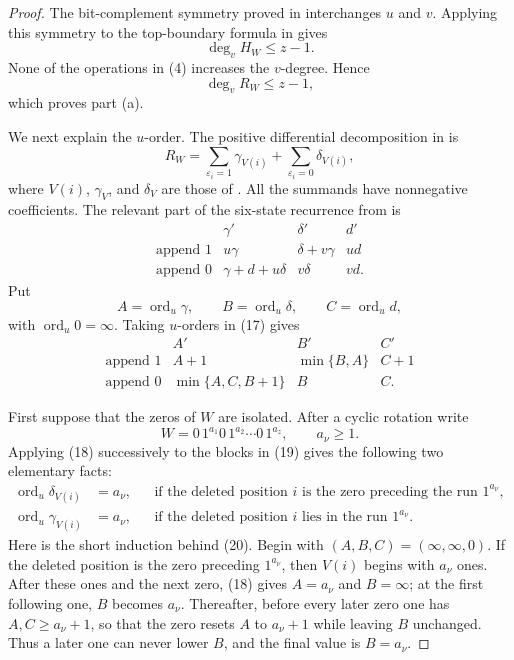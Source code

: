 \documentclass[10pt,a4paper]{article}
\newcommand{\ord}{\operatorname{ord}}
\begin{document}
\begin{proof}
The bit-complement symmetry proved in \cite[proof of Theorem 5.2]{Proof}
interchanges $u$ and $v$.  Applying this symmetry to the top-boundary
formula in \cite[Theorem 8.3, equation (43)]{Proof} gives
\[
                         \deg_v H_W\leq z-1.
\]
None of the operations in (4) increases the $v$-degree.  Hence
\[
                         \deg_v R_W\leq z-1,                 \tag{15}
\]
which proves part (a).

We next explain the $u$-order.  The positive differential decomposition in
\cite[Theorem 5.1, equation (27)]{Proof} is
\[
 R_W=\sum_{\varepsilon_i=1}\gamma_{V(i)}
          +\sum_{\varepsilon_i=0}\delta_{V(i)},              \tag{16}
\]
where $V(i)$, $\gamma_V$, and $\delta_V$ are those of
\cite[Sections 2 and 5]{Proof}.  All the summands have nonnegative
coefficients.  The relevant part
of the six-state recurrence from \cite[Theorem 2.2, equations (6)--(7)]{Proof}
is
\[
\begin{array}{c|ccc}
 &\gamma'&\delta'&d'\\ \hline
 \text{append }1&u\gamma&\delta+v\gamma&ud\\
 \text{append }0&\gamma+d+u\delta&v\delta&vd.
\end{array}                                                   \tag{17}
\]
Put
\[
 A=\ord_u\gamma,\qquad B=\ord_u\delta,
 \qquad C=\ord_ud,
\]
with $\ord_u0=\infty$.  Taking $u$-orders in (17) gives
\[
\begin{array}{c|ccc}
 &A'&B'&C'\\ \hline
 \text{append }1&A+1&\min\{B,A\}&C+1\\
 \text{append }0&\min\{A,C,B+1\}&B&C.
\end{array}                                                   \tag{18}
\]

First suppose that the zeros of $W$ are isolated.  After a cyclic
rotation write
\[
              W=0\,1^{a_1}0\,1^{a_2}\cdots0\,1^{a_z},
              \qquad a_\nu\geq1.                             \tag{19}
\]
Applying (18) successively to the blocks in (19) gives the following
two elementary facts:
\[
\begin{aligned}
 \ord_u\delta_{V(i)}&=a_\nu,
   &&\text{if the deleted position $i$ is the zero preceding
             the run $1^{a_\nu}$},\\
 \ord_u\gamma_{V(i)}&=a_\nu,
   &&\text{if the deleted position $i$ lies in the run
             $1^{a_\nu}$}.
\end{aligned}                                                 \tag{20}
\]
Here is the short induction behind (20).  Begin with
$(A,B,C)=(\infty,\infty,0)$.  If the deleted position is the zero
preceding $1^{a_\nu}$, then $V(i)$ begins with $a_\nu$ ones.  After
these ones and the next zero, (18) gives $A=a_\nu$ and $B=\infty$;
at the first following one, $B$ becomes $a_\nu$.  Thereafter, before
every later zero one has $A,C\geq a_\nu+1$, so that the zero resets
$A$ to $a_\nu+1$ while leaving $B$ unchanged.  Thus a later one can
never lower $B$, and the final value is $B=a_\nu$.


\end{proof}
\end{document}
